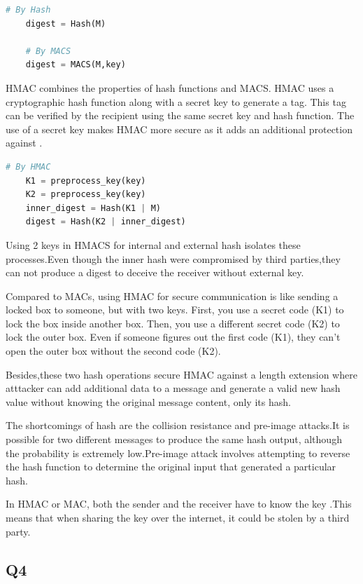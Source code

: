 \documentclass{article}
\begin{document}
	\begin{lstlisting}[language=Python]
	# By Hash
	digest = Hash(M)

	# By MACS
	digest = MACS(M,key)
	\end{lstlisting}

	HMAC combines the properties of hash functions and MACS. HMAC uses a cryptographic hash function along with a secret key to generate a tag. This tag can be verified by the recipient using the same secret key and hash function. The use of a secret key makes HMAC more secure as it adds an additional protection against .

	\begin{lstlisting}[language=Python]
	# By HMAC 
	K1 = preprocess_key(key)
	K2 = preprocess_key(key)
	inner_digest = Hash(K1 | M)
	digest = Hash(K2 | inner_digest)
	\end{lstlisting}

	Using 2 keys in HMACS for internal and external hash isolates these processes.Even though the inner hash were compromised by third parties,they can not produce a digest to deceive the receiver without external key.

	Compared to MACs, using HMAC for secure communication is like sending a locked box to someone, but with two keys. First, you use a secret code (K1) to lock the box inside another box. Then, you use a different secret code (K2) to lock the outer box. Even if someone figures out the first code (K1), they can't open the outer box without the second code (K2).

	Besides,these two hash operations secure HMAC against a length extension where atttacker can add additional data to a message and generate a valid new hash value without knowing the original message content, only its hash\cite{Length_extension_attack}.

	The shortcomings of hash are the collision resistance and pre-image attacks\cite{2-1-1.Hash(1)}.It is possible for two different messages to produce the same hash output, although the probability is extremely low.Pre-image attack involves attempting to reverse the hash function to determine the original input that generated a particular hash.

	In HMAC or MAC, both the sender and the receiver have to know the key .This means that when sharing the key over the internet, it could be stolen by a third party.


\subsection{Q4}
\end{document}
